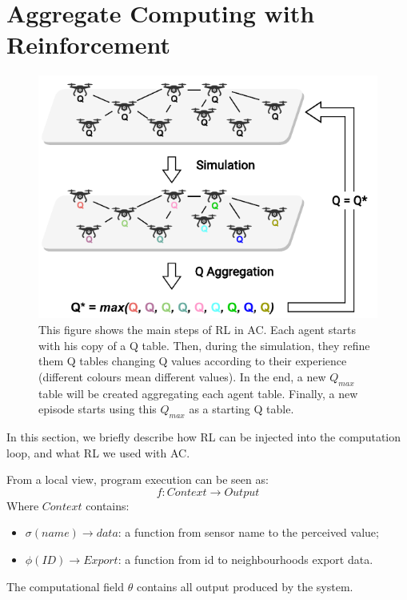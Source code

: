 \documentclass[conference]{IEEEtran}
\begin{document}
\section{Aggregate Computing with Reinforcement}\label{aggregate-and-rl}
\begin{figure}
  \centering
  \includegraphics[width=\linewidth]{img/algorithm-learning.pdf}
  \caption{This figure shows the main steps of RL in AC.
  Each agent starts with his copy of a Q table. 
  Then, during the simulation, they refine them Q tables changing Q values according to their experience (different colours mean different values). 
  In the end, a new $Q_{max}$ table will be created aggregating each agent table. 
  Finally, a new episode starts using this $Q_{max}$ as a starting Q table.
  }
  \label{fig:aggregate-q-learning}
\end{figure}
% 
In this section, we briefly describe how RL can be injected into the computation loop,
 and what RL we used with AC.

From a local view, program execution can be seen as:
$$
f : \textit{Context} \rightarrow \textit{Output}
$$
Where $\textit{Context}$ contains:
\begin{itemize}
  \item $\sigma(name) \rightarrow \textit{data}$: a function from sensor name to the perceived value;
  \item $\phi(\textit{ID}) \rightarrow \textit{Export}$: a function from id to neighbourhoods export data.
\end{itemize}
The computational field $\theta$ contains all output produced by the system.
\end{document}
